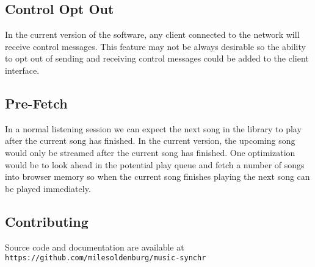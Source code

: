 \documentclass[12pt]{article}
\begin{document}
\subsection{Control Opt Out}
In the current version of the software, any client connected to the network will receive control messages. This feature may not be always desirable so the ability to opt out of sending and receiving control messages could be added to the client interface.

\subsection{Pre-Fetch}
In a normal listening session we can expect the next song in the library to play after the current song has finished. In the current version, the upcoming song would only be streamed after the current song has finished. One optimization would be to look ahead in the potential play queue and fetch a number of songs into browser memory so when the current song finishes playing the next song can be played immediately.

\subsection{Contributing}
\begin{center}
Source code and documentation are available at
{\tt https://github.com/milesoldenburg/music-synchr}
\end{center}
\end{document}
